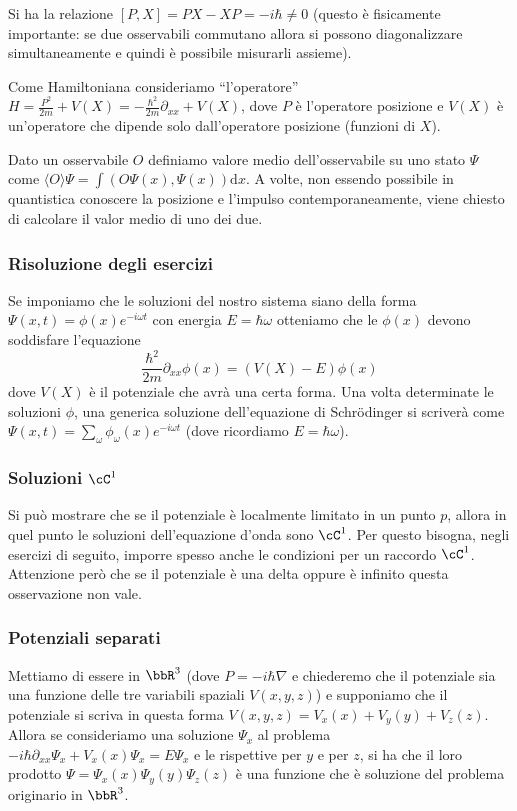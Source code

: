 \documentclass[10pt,a4paper]{article}
\newcommand{\de}{{\ensuremath{ \mbox{d}}}}
\begin{document}
\begin{multicols}{2}
  Si ha la relazione $[P, X] = PX - XP = - i \hbar \neq 0$ (questo è fisicamente importante: se due osservabili commutano allora si possono diagonalizzare simultaneamente e quindi è possibile misurarli assieme).

  Come Hamiltoniana consideriamo ``l'operatore'' $H = \frac{P^2}{2m} + V(X) = - \frac{\hbar^2}{2m} \partial_{xx} + V(X)$, dove $P$ è l'operatore posizione e $V(X)$ è un'operatore che dipende solo dall'operatore posizione (funzioni di $X$).

  Dato un osservabile $O$ definiamo valore medio dell'osservabile su uno stato $\Psi$ come $\langle O \rangle \Psi = \int (O\Psi(x), \Psi(x)) \de x$. A volte, non essendo possibile in quantistica conoscere la posizione e l'impulso contemporaneamente, viene chiesto di calcolare il valor medio di uno dei due.
  
  \subsubsection*{Risoluzione degli esercizi}
  Se imponiamo che le soluzioni del nostro sistema siano della forma $\Psi(x, t) = \phi(x) e^{-i\omega t}$ con energia $E = \hbar \omega$ otteniamo che le $\phi(x)$ devono soddisfare l'equazione
  $$ \frac{\hbar^2}{2m} \partial_{xx} \phi(x) = (V(X) - E) \phi(x) $$
  dove $V(X)$ è il potenziale che avrà una certa forma. Una volta determinate le soluzioni $\phi$, una generica soluzione dell'equazione di Schrödinger si scriverà come $\Psi(x, t) = \sum_\omega \phi_\omega(x) e^{-i \omega t}$ (dove ricordiamo $E = \hbar \omega$).

  \subsubsection*{Soluzioni $\cC^1$}
  Si può mostrare che se il potenziale è localmente limitato in un punto $p$, allora in quel punto le soluzioni dell'equazione d'onda sono $\cC^1$. Per questo bisogna, negli esercizi di seguito, imporre spesso anche le condizioni per un raccordo $\cC^1$. Attenzione però che se il potenziale è una delta oppure è infinito questa osservazione non vale.
  
  \subsubsection*{Potenziali separati}
  Mettiamo di essere in $\bbR^3$ (dove $P = - i \hbar \nabla$ e chiederemo che il potenziale sia una funzione delle tre variabili spaziali $V(x, y, z)$) e supponiamo che il potenziale si scriva in questa forma $V(x, y, z) = V_x(x) + V_y(y) + V_z(z)$. Allora se consideriamo una soluzione $\Psi_x$ al problema $- i \hbar \partial_{xx}\Psi_x + V_x(x) \Psi_x = E \Psi_x$ e le rispettive per $y$ e per $z$, si ha che il loro prodotto $\Psi = \Psi_x(x)\Psi_y(y)\Psi_z(z)$ è una funzione che è soluzione del problema originario in $\bbR^3$.


\end{multicols}
\end{document}
